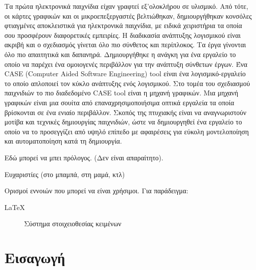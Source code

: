 \documentclass[oneside, 12pt]{book}
\begin{document}
	\Titlepage
	\Declarationpage
	\begin{Abstract}
		Τα πρώτα ηλεκτρονικά παιχνίδια είχαν γραφτεί εξ'ολοκλήρου σε υλισμικό. Από τότε, οι κάρτες γραφικών και οι μικροεπεξεργαστές βελτιώθηκαν, δημιουργήθηκαν κονσόλες φτιαγμένες αποκλειστικά για ηλεκτρονικά παιχνίδια, με ειδικά χειριστήρια τα οποία σου προσφέρουν διαφορετικές εμπειρίες.
		Η διαδικασία ανάπτυξης λογισμικού είναι ακριβή και ο σχεδιασμός γίνεται όλο πιο σύνθετος και περίπλοκος. Τα έργα γίνονται όλο πιο απαιτητικά και δαπανηρά. Δημιουργήθηκε η ανάγκη για ένα εργαλείο το οποίο να παρέχει ένα ομοιογενές περιβάλλον για την ανάπτυξη σύνθετων έργων. 
		Ένα CASE (Computer Aided Software Engineering) tool είναι ένα λογισμικό-εργαλείο το οποίο απλοποιεί τον κύκλο ανάπτυξης ενός λογισμικού. 
		Στο τομέα του σχεδιασμού παιχνιδιών το πιο διαδεδομένο CASE tool είναι η μηχανή γραφικών. Μια μηχανή γραφικών είναι μια σουίτα από επαναχρησιμοποιήσιμα οπτικά εργαλεία τα οποία βρίσκονται σε ένα ενιαίο περιβάλλον.
		Σκοπός της πτυχιακής είναι να αναγνωριστούν μοτίβα και τεχνικές δημιουργίας παιχνιδιών, ώστε να δημιουργηθεί ένα εργαλείο το οποίο να το προσεγγίζει από υψηλό επίπεδο με αφαιρέσεις για εύκολη μοντελοποίηση και αυτοματοποίηση κατά τη δημιουργία.
	\end{Abstract}
	\tableofcontents
	
	\listoftables
	\listoffigures
	
	\begin{Preface}
		Εδώ μπορεί να μπει πρόλογος. (Δεν είναι απαραίτητο).
	\end{Preface}
	
	\begin{Acknowledgement}
		Ευχαριστίες (στο μπαμπά, στη μαμά, κτλ)
	\end{Acknowledgement}
	
	\begin{Definitions}
		Ορισμοί εννοιών που μπορεί να είναι χρήσιμοι. Για παράδειγμα:
		
		\begin{description}
			\item [\LaTeX] Σύστημα στοιχειοθεσίας κειμένων
		\end{description}
		
	\end{Definitions}
	
	\chapter{Εισαγωγή}
	\leftmark\rightmark
\end{document}
